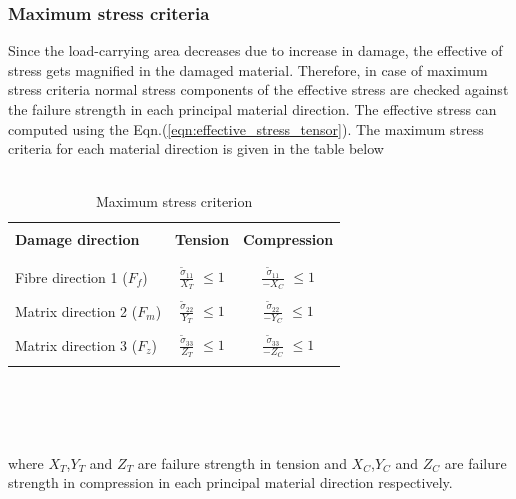 \documentclass[a4paper,12pt]{article}
\begin{document}
\subsubsection{Maximum stress criteria}
\indent\indent\indent Since the load-carrying area decreases due to increase in damage, the effective of stress gets magnified in the damaged material. Therefore, in case of maximum stress criteria normal stress components of the effective stress are checked against the failure strength in each principal material direction. The effective stress can computed using the Eqn.(\ref{eqn:effective_stress_tensor}). The maximum stress criteria for each material direction is given in the table below
\\
\\
\begin{table}[h!]
  \begin{center}
     \begin{tabular}{l  c  c} 
     \hline
     \\
      \textbf{Damage direction} \;\;& \textbf{Tension} \;& \textbf{Compression}\\
      \\
      \hline
      \\
      Fibre direction 1 ($F_{f}$) & \Large{$\frac{\tilde{\sigma}_{11}}{X_{T}} $}\small{ $\leq 1$} & \Large{$\frac{\tilde{\sigma}_{11}}{-X_{C}} $}\small{ $\leq 1$} \\
      \\
      Matrix direction 2 ($F_{m}$)  &  \Large{$\frac{\tilde{\sigma}_{22}}{Y_{T}} $}\small{ $\leq 1$}  & \Large{$\frac{\tilde{\sigma}_{22}}{-Y_{C}} $}\small{ $\leq 1$}\\
      \\
      Matrix direction 3 ($F_{z}$) &  \Large{$\frac{\tilde{\sigma}_{33}}{Z_{T}} $}\small{ $\leq 1$}  &   \Large{$\frac{\tilde{\sigma}_{33}}{-Z_{C}} $}\small{ $\leq 1$}\\
       \\
       \hline
    \end{tabular}
    \\
    \caption{Maximum stress criterion}
    \label{tab:Maximum stress criterion}
  \end{center}
\end{table}\\
\\
where $X_{T}$,$ Y_{T} $ and $Z_{T}$ are failure strength in tension and $X_{C}$,$ Y_{C} $ and $Z_{C}$ are failure strength in compression in each principal material direction respectively.
\end{document}
